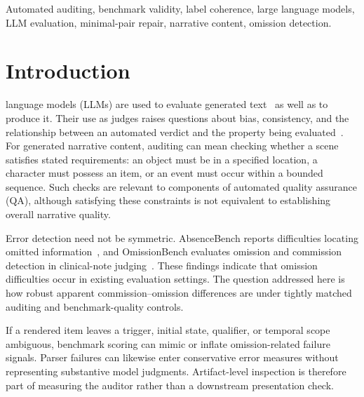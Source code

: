 \documentclass{ieeeaccess}
\begin{document}
\begin{keywords}
Automated auditing, benchmark validity, label coherence, large language models, LLM evaluation, minimal-pair repair, narrative content, omission detection.
\end{keywords}

\titlepgskip=-21pt
\maketitle

\section{Introduction}
\label{sec:introduction}
 language models (LLMs) are used to evaluate generated text~\cite{liu2023geval} as well as to produce it. Their use as judges raises questions about bias, consistency, and the relationship between an automated verdict and the property being evaluated~\cite{zheng2023judge,chen2024judgebias}. For generated narrative content, auditing can mean checking whether a scene satisfies stated requirements: an object must be in a specified location, a character must possess an item, or an event must occur within a bounded sequence. Such checks are relevant to components of automated quality assurance (QA), although satisfying these constraints is not equivalent to establishing overall narrative quality.

Error detection need not be symmetric. AbsenceBench reports difficulties locating omitted information~\cite{fu2025absence}, and OmissionBench evaluates omission and commission detection in clinical-note judging~\cite{fox2026omission}. These findings indicate that omission difficulties occur in existing evaluation settings. The question addressed here is how robust apparent commission--omission differences are under tightly matched auditing and benchmark-quality controls.

If a rendered item leaves a trigger, initial state, qualifier, or temporal scope ambiguous, benchmark scoring can mimic or inflate omission-related failure signals. Parser failures can likewise enter conservative error measures without representing substantive model judgments. Artifact-level inspection is therefore part of measuring the auditor rather than a downstream presentation check.
\end{document}
